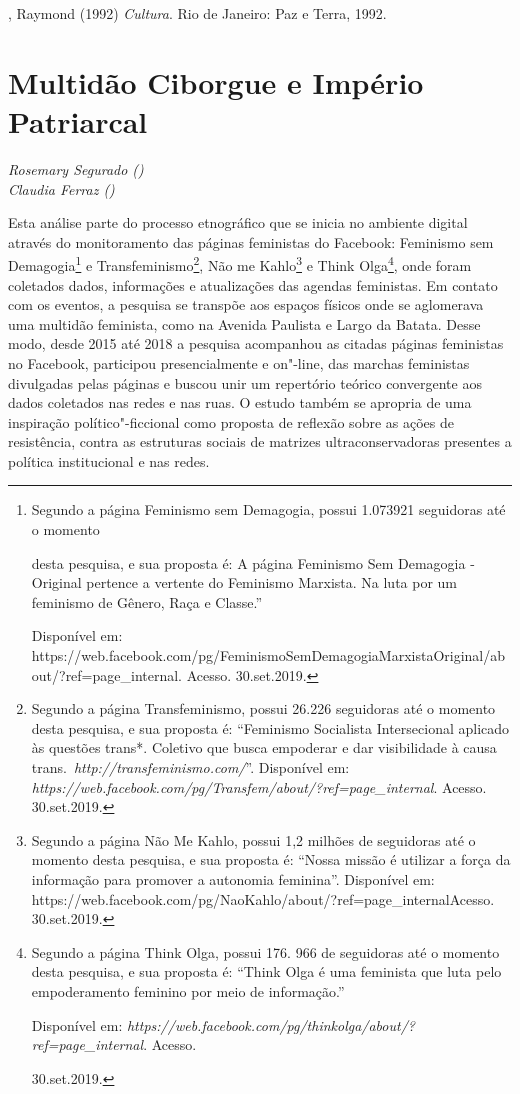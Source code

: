 , Raymond (1992) \emph{Cultura}. Rio de Janeiro: Paz e Terra,
1992.

\chapter*{Multidão Ciborgue e Império Patriarcal}

\begin{flushright}
\emph{Rosemary Segurado ()\\Claudia Ferraz ()}
\end{flushright}

Esta análise parte do processo etnográfico que se inicia no ambiente
digital através do monitoramento das páginas feministas do Facebook:
Feminismo sem Demagogia\footnote{Segundo a página Feminismo sem
  Demagogia, possui 1.073921 seguidoras até o momento

  desta pesquisa, e sua proposta é: A página Feminismo Sem Demagogia -
  Original pertence a vertente do Feminismo Marxista. Na luta por um
  feminismo de Gênero, Raça e Classe.''

  Disponível em:
  https://web.facebook.com/pg/FeminismoSemDemagogiaMarxistaOriginal/about/?ref=page\_internal.
  Acesso. 30.set.2019.} e Transfeminismo\footnote{Segundo a página
  Transfeminismo, possui 26.226 seguidoras até o momento desta pesquisa,
  e sua proposta é: ``Feminismo Socialista Intersecional aplicado às
  questões trans*. Coletivo que busca empoderar e dar visibilidade à
  causa
  trans.~\emph{http://transfeminismo.com/}''.
  Disponível em:
  \emph{https://web.facebook.com/pg/Transfem/about/?ref=page\_internal}.
  Acesso. 30.set.2019.}, Não me Kahlo\footnote{Segundo a página Não Me
  Kahlo, possui 1,2 milhões de seguidoras até o momento desta pesquisa,
  e sua proposta é: ``Nossa missão é utilizar a força da informação para
  promover a autonomia feminina''. Disponível em:
  https://web.facebook.com/pg/NaoKahlo/about/?ref=page\_internalAcesso.
  30.set.2019.} e Think Olga\footnote{Segundo a página Think Olga,
  possui 176. 966 de seguidoras até o momento desta pesquisa, e sua
  proposta é: ``Think Olga é uma  feminista que luta pelo
  empoderamento feminino por meio de informação.''

  Disponível em:
  \emph{https://web.facebook.com/pg/thinkolga/about/?ref=page\_internal}.
  Acesso.

  30.set.2019.}, onde foram coletados dados, informações e atualizações
das agendas feministas. Em contato com os eventos, a pesquisa se
transpõe aos espaços físicos onde se aglomerava uma multidão feminista,
como na Avenida Paulista e Largo da Batata. Desse modo, desde 2015 até
2018 a pesquisa acompanhou as citadas páginas feministas no Facebook,
participou presencialmente e on"-line, das marchas feministas divulgadas
pelas páginas e buscou unir um repertório teórico convergente aos dados
coletados nas redes e nas ruas. O estudo também se apropria de uma
inspiração político"-ficcional como proposta de reflexão sobre as ações
de resistência, contra as estruturas sociais de matrizes
ultraconservadoras presentes a política institucional e nas redes.

